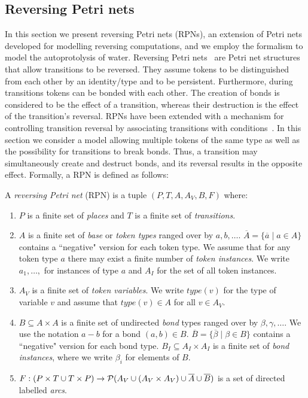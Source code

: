 \documentclass[runningheads]{llncs}
\newcommand{\PN}{reversing Petri net }
\newcommand{\bond}{\!-\!}
\newcommand{\type}{\mathit{type}}
\begin{document}
\subsection{Reversing Petri nets}
In this section we present reversing Petri nets (RPNs), an extension of Petri nets
developed for modelling reversing computations, and we employ the formalism
to model the autoprotolysis of water. Reversing Petri nets~\cite{RPNs} are 
Petri net structures that allow transitions to be reversed. They assume 
tokens to be distinguished from each other by an identity/type and to be persistent. Furthermore,
during transitions tokens can be bonded with each other. The creation of bonds
is considered to be the effect of a transition, whereas their destruction is the effect of
the transition's reversal. RPNs
have been extended with a mechanism for controlling transition
reversal by associating transitions with conditions~\cite{CRPNs}. In this section we consider
a model allowing multiple tokens of the same type as well as the possibility for 
transitions to break bonds. Thus, a transition may simultaneously create
and destruct bonds, and its reversal results in the opposite effect. Formally, a RPN
is defined as follows:
\begin{definition}{\rm
		A \emph{\PN}(RPN) is a tuple $(P,T,  A, A_V, B, F)$ where:
		\begin{enumerate}
			\item $P$ is a finite set of \emph{places} and
			$T$ is a finite set of \emph{transitions}.
			\item $A$ is a finite set of \emph{base} or \emph{token types} ranged over by $a, b,\ldots$.
			$\overline{A} = 
			\{\overline{a}\mid a\in A\}$ contains a ``negative"  version for each token type. We assume that
			for any token type $a$ there may exist a finite number of \emph{token instances}. 
			We write $a_1,\ldots,$ for
			instances of type $a$ and $A_I$ for the set of all token instances. 
			\item $A_V$ is a finite set of \emph{token variables}. We write $\type(v)$ for the type
			of variable $v$ and assume that $\type(v) \in A$ for all $v\in A_V$.
			\item $B\subseteq A\times A$ is a finite set of undirected \emph{bond} types ranged over
			by $\beta,\gamma,\ldots$. We use the notation $a \bond b$ for a bond $(a,b)\in B$.  
			$\overline{B} = \{\overline{\beta}\mid \beta\in B\}$ contains a ``negative" version for 
			each bond type. $B_I\subseteq A_I\times A_I$ is a finite set of \emph{bond instances},
			where we write $\beta_i$ 
			for elements of $B$.
			\item $F : (P\times T  \cup T \times P)\rightarrow {\cal P}( A_V \cup (A_V \times A_V) \cup \overline{A}
			\cup \overline{B}) $ 
			is a set of directed labelled \emph{arcs}.
		\end{enumerate}
}\end{definition}
\end{document}
